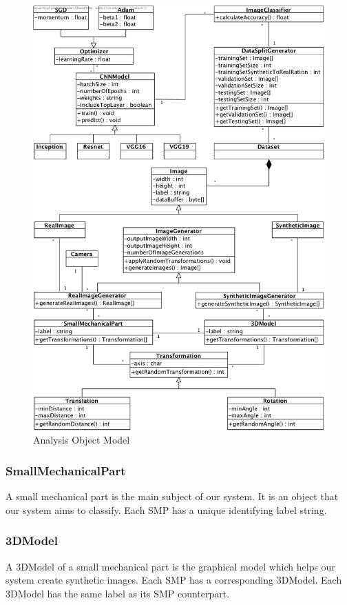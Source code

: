 \documentclass[a4paper,12pt,twoside]{report}
\begin{document}
\begin{figure}[t]
\centering
  \includegraphics[width=\textwidth]{AOM}
\caption{Analysis Object Model}
\label{fig:AOM}
\end{figure}

\subsubsection{SmallMechanicalPart}
A small mechanical part is the main subject of our system. It is an object that our system aims to classify. Each SMP has a unique identifying label string.

\subsubsection{3DModel}
A 3DModel of a small mechanical part is the graphical model which helps our system create synthetic images. Each SMP has a corresponding 3DModel. Each 3DModel has the same label as its SMP counterpart.
\end{document}
